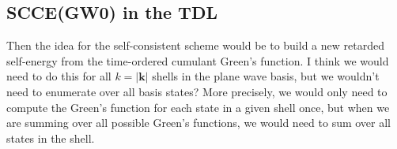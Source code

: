 \subsection{SCCE(GW0) in the TDL}
Then the idea for the self-consistent scheme would be to build a new retarded self-energy from the time-ordered cumulant Green's function. I think we would need to do this for all $k=|\bm{k}|$ shells in the plane wave basis, but we wouldn't need to enumerate over all basis states? More precisely, we would only need to compute the Green's function for each state in a given shell once, but when we are summing over all possible Green's functions, we would need to sum over all states in the shell. 
